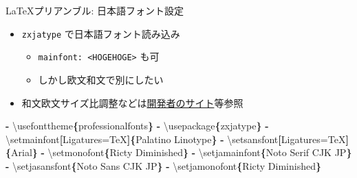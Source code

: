 \documentclass[14pt,ignorenonframetext,]{beamer}
\newenvironment{Shaded}{\begin{snugshade}}{\end{snugshade}}
\newcommand{\KeywordTok}[1]{\textcolor[rgb]{0.13,0.29,0.53}{\textbf{#1}}}
\newcommand{\NormalTok}[1]{#1}
\providecommand{\tightlist}{%
  \setlength{\itemsep}{0pt}\setlength{\parskip}{0pt}}
\begin{document}
\begin{frame}[fragile]{\LaTeX プリアンブル: 日本語フォント設定}
\protect\hypertarget{ux30d7ux30eaux30a2ux30f3ux30d6ux30eb-ux65e5ux672cux8a9eux30d5ux30a9ux30f3ux30c8ux8a2dux5b9a}{}

\begin{itemize}
\tightlist
\item
  \texttt{zxjatype} で日本語フォント読み込み

  \begin{itemize}
  \tightlist
  \item
    \texttt{mainfont:\ \textless{}HOGEHOGE\textgreater{}} も可
  \item
    しかし欧文和文で別にしたい
  \end{itemize}
\item
  和文欧文サイズ比調整などは\href{http://zrbabbler.sp.land.to/zxjatype.html}{開発者のサイト}等参照
\end{itemize}

\begin{Shaded}
\begin{Highlighting}[]

\KeywordTok{-}\NormalTok{ \textbackslash{}usefonttheme}\KeywordTok{\{}\NormalTok{professionalfonts}\KeywordTok{\}}
\KeywordTok{-}\NormalTok{ \textbackslash{}usepackage}\KeywordTok{\{}\NormalTok{zxjatype}\KeywordTok{\}}
\KeywordTok{-}\NormalTok{ \textbackslash{}setmainfont}\KeywordTok{[}\NormalTok{Ligatures=TeX}\KeywordTok{]\{}\NormalTok{Palatino Linotype}\KeywordTok{\}}
\KeywordTok{-}\NormalTok{ \textbackslash{}setsansfont}\KeywordTok{[}\NormalTok{Ligatures=TeX}\KeywordTok{]\{}\NormalTok{Arial}\KeywordTok{\}}
\KeywordTok{-}\NormalTok{ \textbackslash{}setmonofont}\KeywordTok{\{}\NormalTok{Ricty Diminished}\KeywordTok{\}}
\KeywordTok{-}\NormalTok{ \textbackslash{}setjamainfont}\KeywordTok{\{}\NormalTok{Noto Serif CJK JP}\KeywordTok{\}}
\KeywordTok{-}\NormalTok{ \textbackslash{}setjasansfont}\KeywordTok{\{}\NormalTok{Noto Sans CJK JP}\KeywordTok{\}}
\KeywordTok{-}\NormalTok{ \textbackslash{}setjamonofont}\KeywordTok{\{}\NormalTok{Ricty Diminished}\KeywordTok{\}}
\end{Highlighting}
\end{Shaded}

\end{frame}
\end{document}
